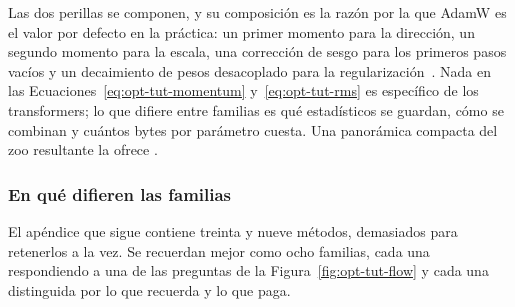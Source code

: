 Las dos perillas se componen, y su composición es la razón por la que AdamW es
el valor por defecto en la práctica: un primer momento para la dirección, un
segundo momento para la escala, una corrección de sesgo para los primeros pasos
vacíos y un decaimiento de pesos desacoplado para la
regularización~\citep{kingma_adam_2014}. Nada en las
Ecuaciones~\eqref{eq:opt-tut-momentum} y~\eqref{eq:opt-tut-rms} es específico de
los transformers; lo que difiere entre familias es qué estadísticos se guardan,
cómo se combinan y cuántos bytes por parámetro cuesta. Una panorámica compacta
del zoo resultante la ofrece \citet{ruder_2016}.

\subsubsection{En qué difieren las familias}
\label{sec:opt-tutorial-families}

El apéndice que sigue contiene treinta y nueve métodos, demasiados para
retenerlos a la vez. Se recuerdan mejor como ocho familias, cada una respondiendo
a una de las preguntas de la Figura~\ref{fig:opt-tut-flow} y cada una distinguida
por lo que recuerda y lo que paga.

